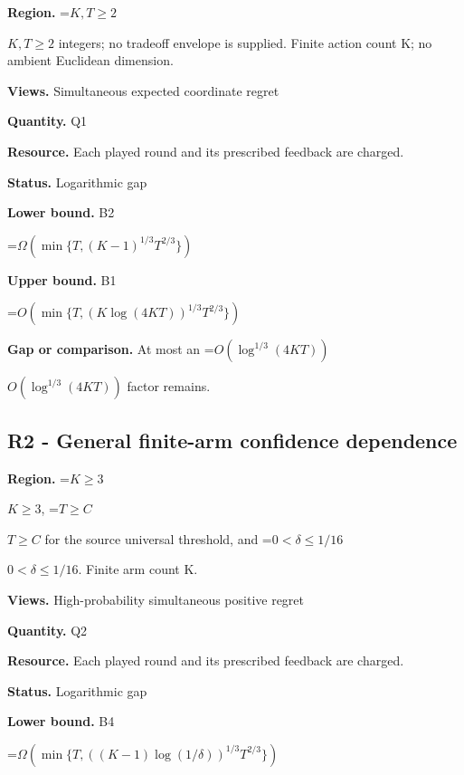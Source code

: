\documentclass[10pt,a4paper]{article}
\newcommand{\AtlasMath}[1]{\par\begingroup\centering\setbox0=\hbox{$\displaystyle #1$}\ifdim\wd0>1.4\linewidth\typeout{ATLAS WIDE FORMULA: \the\wd0}\fi\ifdim\wd0>\linewidth\resizebox{\linewidth}{!}{\box0}\else\box0\fi\par\endgroup}
\newcommand{\AtlasInlineMath}[1]{\begingroup\setbox0=\hbox{$#1$}\ifdim\wd0>.4\linewidth\endgroup\AtlasMath{#1}\else\endgroup$#1$\fi}
\begin{document}
\textbf{Region.} \AtlasInlineMath{K,T\ge2} integers; no tradeoff envelope is supplied. Finite action count K; no ambient Euclidean dimension.



\textbf{Views.} Simultaneous expected coordinate regret



\textbf{Quantity.} Q1



\textbf{Resource.} Each played round and its prescribed feedback are charged.



\textbf{Status.} Logarithmic gap



\textbf{Lower bound.} B2



\AtlasMath{\Omega\!\left(\min\{T,(K-1)^{1/3}T^{2/3}\}\right)}


\textbf{Upper bound.} B1



\AtlasMath{O\!\left(\min\{T,(K\log(4KT))^{1/3}T^{2/3}\}\right)}


\textbf{Gap or comparison.} At most an \AtlasInlineMath{O(\log^{1/3}(4KT))} factor remains.



\subsection{R2 - General finite-arm confidence dependence}


\textbf{Region.} \AtlasInlineMath{K\ge3}, \AtlasInlineMath{T\ge C} for the source universal threshold, and \AtlasInlineMath{0<\delta\le1/16}. Finite arm count K.



\textbf{Views.} High-probability simultaneous positive regret



\textbf{Quantity.} Q2



\textbf{Resource.} Each played round and its prescribed feedback are charged.



\textbf{Status.} Logarithmic gap



\textbf{Lower bound.} B4



\AtlasMath{\Omega\!\left(\min\{T,((K-1)\log(1/\delta))^{1/3}T^{2/3}\}\right)}
\end{document}
